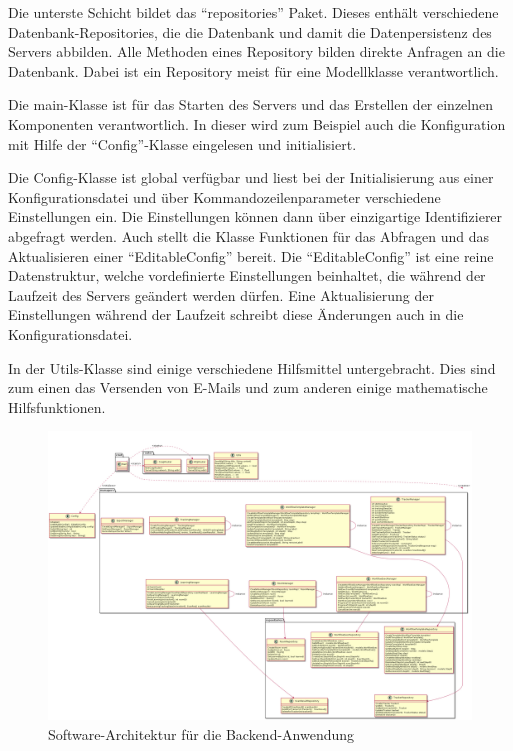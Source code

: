 Die unterste Schicht bildet das \enquote{repositories} Paket.
Dieses enthält verschiedene Datenbank-Repositories, die die Datenbank und damit die Datenpersistenz des Servers abbilden.
Alle Methoden eines Repository bilden direkte Anfragen an die Datenbank.
Dabei ist ein Repository meist für eine Modellklasse verantwortlich.

Die main-Klasse ist für das Starten des Servers und das Erstellen der einzelnen Komponenten verantwortlich.
In dieser wird zum Beispiel auch die Konfiguration mit Hilfe der \enquote{Config}-Klasse eingelesen und initialisiert.

Die Config-Klasse ist global verfügbar und liest bei der Initialisierung aus einer Konfigurationsdatei
und über Kommandozeilenparameter verschiedene Einstellungen ein.
Die Einstellungen können dann über einzigartige Identifizierer abgefragt werden.
Auch stellt die Klasse Funktionen für das Abfragen und das Aktualisieren einer \enquote{EditableConfig} bereit.
Die \enquote{EditableConfig} ist eine reine Datenstruktur, welche vordefinierte Einstellungen beinhaltet, die während
der Laufzeit des Servers geändert werden dürfen.
Eine Aktualisierung der Einstellungen während der Laufzeit schreibt diese Änderungen auch in die Konfigurationsdatei.

In der Utils-Klasse sind einige verschiedene Hilfsmittel untergebracht.
Dies sind zum einen das Versenden von E-Mails und zum anderen einige mathematische Hilfsfunktionen.

\begin{figure}
	\includegraphics[width=.9\textheight]{images/server_architecture.png}
	\caption{Software-Architektur für die Backend-Anwendung}
	\label{fig:software-architecture}
\end{figure}

